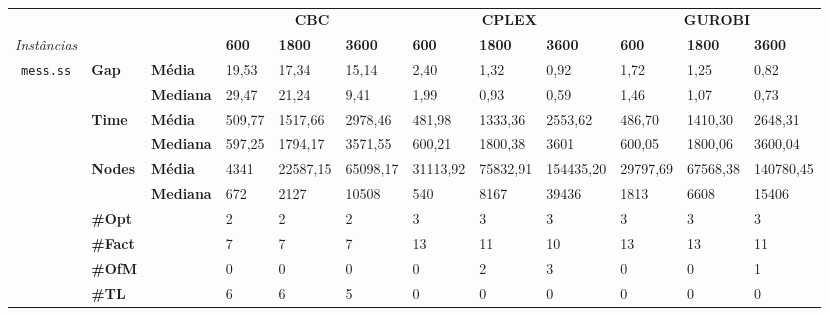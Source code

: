 
\begin{table}[]
	\begin{adjustbox}{angle=90}
	\begin{tabular}{cll|lll|lll|lll}
	& & & \multicolumn{3}{c}{\textbf{CBC}} & \multicolumn{3}{c}{\textbf{CPLEX}} & \multicolumn{3}{c}{\textbf{GUROBI}} 	\\\textit{Instâncias} & & & \textbf{600} & \textbf{1800} & \textbf{3600} & \textbf{600} & \textbf{1800} & \textbf{3600} & \textbf{600} & \textbf{1800} & \textbf{3600} \\
\hline
\multirow{7}{*}{\texttt{mess.ss}} & \multirow{2}{*}{\textbf{Gap}} & \textbf{Média} & 19,53 & 17,34 & 15,14 & 2,40 & 1,32 & 0,92 & 1,72 & 1,25 & 0,82 \\
 & & \textbf{Mediana} & 29,47 & 21,24 & 9,41 & 1,99 & 0,93 & 0,59 & 1,46 & 1,07 & 0,73 \\
\cline{2-12}
 & \multirow{2}{*}{\textbf{Time}} & \textbf{Média} & 509,77 & 1517,66 & 2978,46 & 481,98 & 1333,36 & 2553,62 & 486,70 & 1410,30 & 2648,31 \\
 & & \textbf{Mediana} & 597,25 & 1794,17 & 3571,55 & 600,21 & 1800,38 & 3601 & 600,05 & 1800,06 & 3600,04 \\
\cline{2-12}
 & \multirow{2}{*}{\textbf{Nodes}} & \textbf{Média} & 4341 & 22587,15 & 65098,17 & 31113,92 & 75832,91 & 154435,20 & 29797,69 & 67568,38 & 140780,45 \\
 & & \textbf{Mediana} & 672 & 2127 & 10508 & 540 & 8167 & 39436 & 1813 & 6608 & 15406 \\
\cline{2-12}
 & \textbf{\#Opt} & & 2 & 2 & 2 & 3 & 3 & 3 & 3 & 3 & 3 \\
 & \textbf{\#Fact} & & 7 & 7 & 7 & 13 & 11 & 10 & 13 & 13 & 11 \\
 & \textbf{\#OfM} & & 0 & 0 & 0 & 0 & 2 & 3 & 0 & 0 & 1 \\
 & \textbf{\#TL} & & 6 & 6 & 5 & 0 & 0 & 0 & 0 & 0 & 0 \\
	\end{tabular}
	\end{adjustbox}
	\label{cflp:tab:5}
	\caption{}
\end{table}

